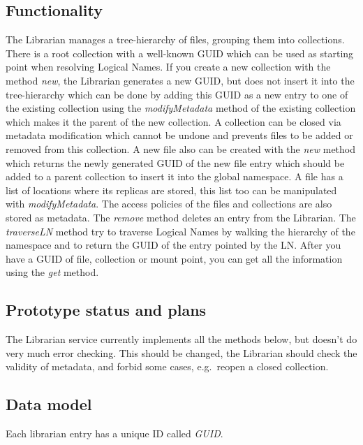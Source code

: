 \documentclass{book}
\begin{document}
\subsection{Functionality} %
% 
The Librarian manages a tree-hierarchy of files, grouping them into collections. There is a root collection with a well-known GUID which can be used as starting point when resolving Logical Names. If you create a new collection with the method \emph{new}, the Librarian generates a new GUID, but does not insert it into the tree-hierarchy which can be done by adding this GUID as a new entry to one of the existing collection using the \emph{modifyMetadata} method of the existing collection which makes it the parent of the new collection. A collection can be closed via metadata modification which cannot be undone and prevents files to be added or removed from this collection. A new file  also can be created with the \emph{new} method which returns the newly generated GUID of the new file entry which should be added to a parent collection to insert it into the global namespace. A file has a list of locations where its replicas are stored, this list too can be manipulated with \emph{modifyMetadata}. The access policies of the files and collections are also stored as metadata. The \emph{remove} method deletes an entry from the Librarian. The \emph{traverseLN} method try to traverse Logical Names by walking the hierarchy of the namespace and to return the GUID of the entry pointed by the LN. After you have a GUID of file, collection or mount point, you can get all the information using the \emph{get} method. 


\subsection{Prototype status and plans} %

The Librarian service currently implements all the methods below, but doesn't do very much error checking. This should be changed, the Librarian should check the validity of metadata, and forbid some cases, e.g.~reopen a closed collection.


\subsection{Data model} %
\label{sub:data_model}
Each librarian entry has a unique ID called \emph{GUID}.
\end{document}

